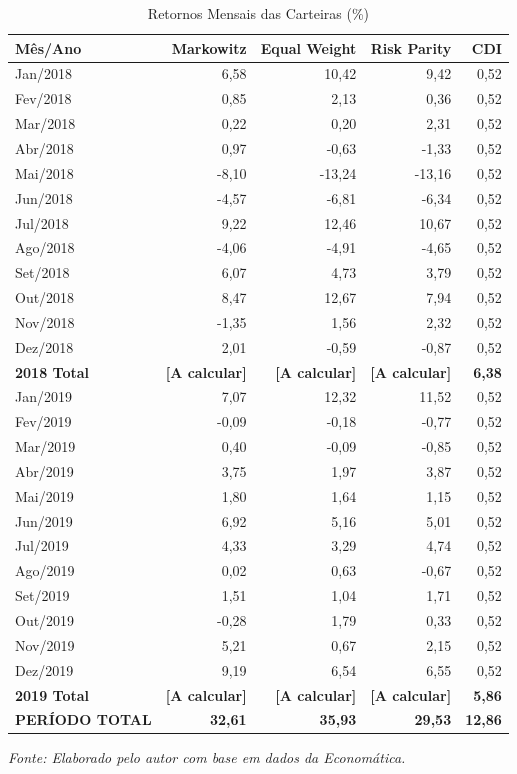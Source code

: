 \begin{table}[H]
\centering
\caption{Retornos Mensais das Carteiras (\%)}
\scriptsize
\begin{tabular}{|l|r|r|r|r|}
\hline
\textbf{Mês/Ano} & \textbf{Markowitz} & \textbf{Equal Weight} & \textbf{Risk Parity} & \textbf{CDI} \\
\hline
Jan/2018 & 6,58 & 10,42 & 9,42 & 0,52 \\
Fev/2018 & 0,85 & 2,13 & 0,36 & 0,52 \\
Mar/2018 & 0,22 & 0,20 & 2,31 & 0,52 \\
Abr/2018 & 0,97 & -0,63 & -1,33 & 0,52 \\
Mai/2018 & -8,10 & -13,24 & -13,16 & 0,52 \\
Jun/2018 & -4,57 & -6,81 & -6,34 & 0,52 \\
Jul/2018 & 9,22 & 12,46 & 10,67 & 0,52 \\
Ago/2018 & -4,06 & -4,91 & -4,65 & 0,52 \\
Set/2018 & 6,07 & 4,73 & 3,79 & 0,52 \\
Out/2018 & 8,47 & 12,67 & 7,94 & 0,52 \\
Nov/2018 & -1,35 & 1,56 & 2,32 & 0,52 \\
Dez/2018 & 2,01 & -0,59 & -0,87 & 0,52 \\
\hline
\textbf{2018 Total} & \textbf{[A calcular]} & \textbf{[A calcular]} & \textbf{[A calcular]} & \textbf{6,38} \\
\hline
Jan/2019 & 7,07 & 12,32 & 11,52 & 0,52 \\
Fev/2019 & -0,09 & -0,18 & -0,77 & 0,52 \\
Mar/2019 & 0,40 & -0,09 & -0,85 & 0,52 \\
Abr/2019 & 3,75 & 1,97 & 3,87 & 0,52 \\
Mai/2019 & 1,80 & 1,64 & 1,15 & 0,52 \\
Jun/2019 & 6,92 & 5,16 & 5,01 & 0,52 \\
Jul/2019 & 4,33 & 3,29 & 4,74 & 0,52 \\
Ago/2019 & 0,02 & 0,63 & -0,67 & 0,52 \\
Set/2019 & 1,51 & 1,04 & 1,71 & 0,52 \\
Out/2019 & -0,28 & 1,79 & 0,33 & 0,52 \\
Nov/2019 & 5,21 & 0,67 & 2,15 & 0,52 \\
Dez/2019 & 9,19 & 6,54 & 6,55 & 0,52 \\
\hline
\textbf{2019 Total} & \textbf{[A calcular]} & \textbf{[A calcular]} & \textbf{[A calcular]} & \textbf{5,86} \\
\hline
\textbf{PERÍODO TOTAL} & \textbf{32,61} & \textbf{35,93} & \textbf{29,53} & \textbf{12,86} \\
\hline
\end{tabular}
\normalsize

\textit{Fonte: Elaborado pelo autor com base em dados da Economática.}
\label{tab:monthly_returns}
\end{table}

